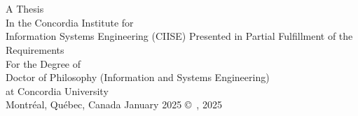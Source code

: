 
\thispagestyle{empty} %

\begin{center} 
\begin{Large} \subject \end{Large}\\[3em]
\begin{large} \student \end{large}\\
\vfill
A Thesis\\
In the Concordia Institute for 
\\ Information Systems Engineering (CIISE)
\vfill
Presented in Partial Fulfillment of the Requirements\\
For the Degree of\\
Doctor of Philosophy (Information and Systems Engineering)\\
at Concordia University\\
Montr\'{e}al, Qu\'{e}bec, Canada
\vfill
January 2025
\vfill
\copyright~\student, 2025\\

\end{center}



